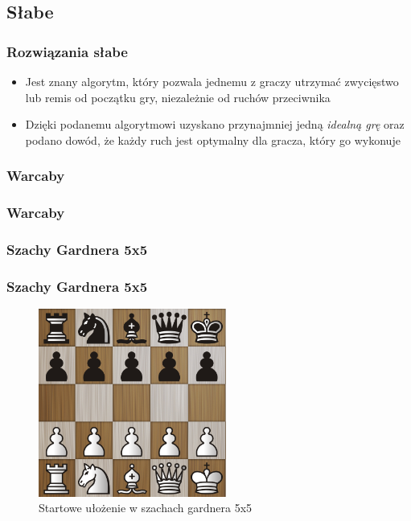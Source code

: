 \documentclass[polish,envcountsect,10pt]{beamer}
\begin{document}
            \subsection{Słabe}
            \begin{frame}
                \frametitle{Rozwiązania słabe}
                \begin{itemize}
                    \item<1-> Jest znany algorytm, który pozwala jednemu z graczy utrzymać zwycięstwo lub remis od początku gry, niezależnie od ruchów przeciwnika
                    \item<2-> Dzięki podanemu algorytmowi uzyskano przynajmniej jedną \textit{idealną grę} oraz podano dowód, że każdy ruch jest optymalny dla gracza, który go wykonuje                    
                \end{itemize}     
            \end{frame}
            \subsubsection{Warcaby}
                \begin{frame}
                    \frametitle{Warcaby}
                \end{frame}
            \subsubsection{Szachy Gardnera 5x5}
                \begin{frame}
                    \frametitle{Szachy Gardnera 5x5}
                    \begin{figure}[H]
                        \centering
                        \includegraphics[width=0.55\textwidth]{images/gardner.png}
                        \caption{Startowe ułożenie w szachach gardnera 5x5}
                    \end{figure}
                \end{frame}
\end{document}
